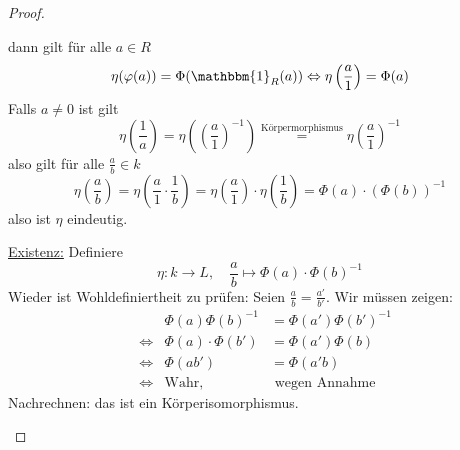 \documentclass[a4paper,12pt,numbers=noenddot,parskip=full]{scrartcl}
\newcommand{\heading}{\underline}
\theoremstyle{dotless}
\theoremstyle{remark}
\begin{document}
\begin{proof}
\begin{enumerate}
\begin{center}
			\end{center}
			dann gilt für alle $a \in R$
			\begin{equation*}
				\eta(\varphi(a)) = \Phi(\mathbbm{1}_R(a)) \Leftrightarrow \eta\left(\frac{a}{1}\right) = \Phi(a)
			\end{equation*}
			Falls $a \neq 0$ ist gilt
			\begin{equation*}
				\eta\left( \frac{1}{a} \right) = \eta\left( \left( \frac{a}{1} \right)^{-1} \right) \overset{\text{Körpermorphismus}}{=} \eta \left( \frac{a}{1} \right)^{-1}
			\end{equation*}
			also gilt für alle $\frac{a}{b} \in k$
			\begin{equation*}
				\eta \left( \frac{a}{b} \right) = \eta \left( \frac{a}{1} \cdot \frac{1}{b} \right) = \eta\left( \frac{a}{1} \right) \cdot \eta \left(
				\frac{1}{b}\right) = \Phi(a) \cdot \left( \Phi(b) \right)^{-1}
			\end{equation*}
			also ist $\eta$ eindeutig.
			
			\heading{Existenz:} Definiere
			\begin{equation*}
				\eta: k \to L, \quad \frac{a}{b} \mapsto \Phi(a) \cdot \Phi(b)^{-1}
			\end{equation*}
			Wieder ist Wohldefiniertheit zu prüfen: Seien $\frac{a}{b} = \frac{a'}{b'}$. Wir müssen zeigen:
			\begin{align*}
				&& \Phi(a) \Phi(b)^{-1} &= \Phi(a') \Phi(b')^{-1} \\
				&\Leftrightarrow& \Phi(a) \cdot \Phi(b') &= \Phi(a') \Phi(b) \\
				&\Leftrightarrow& \Phi(ab') &= \Phi(a'b) \\
				&\Leftrightarrow& \text{Wahr,}& \text{ wegen Annahme}
			\end{align*}
			Nachrechnen: das ist ein Körperisomorphismus.
		\end{enumerate}
	\end{proof}
\newpage
\end{document}

